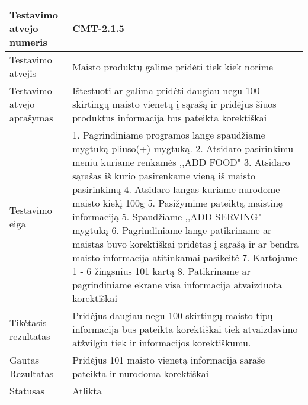 \documentclass[oneside]{VUMIFPSkursinis}
\begin{document}
\begin{center}
    \begin{tabular}{ |p{5cm}|p{13cm}|}
    \hline
        Testavimo atvejo numeris & CMT-2.1.5  \\ \hline
        Testavimo atvejis & Maisto produktų galime pridėti tiek kiek norime  \\ \hline
        Testavimo atvejo aprašymas & Ištestuoti ar galima pridėti daugiau negu 100 skirtingų maisto vienetų į sąrašą ir pridėjus šiuos produktus informacija bus pateikta korektiškai \\ \hline
        Testavimo eiga & 1. Pagrindiniame programos lange spaudžiame mygtuką pliuso(+) mygtuką. 
				2. Atsidaro pasirinkimu meniu kuriame renkamės ,,ADD FOOD"
				3. Atsidaro sąrašas iš kurio pasirenkame vieną iš maisto pasirinkimų
				4. Atsidaro langas kuriame nurodome maisto kiekį 100g
				5. Pasižymime pateiktą maistinę informaciją
				5. Spaudžiame ,,ADD SERVING"  mygtuką
				6. Pagrindiniame lange patikriname ar maistas buvo korektiškai pridėtas į sąrašą ir ar bendra maisto informacija atitinkamai pasikeitė 
				7. Kartojame 1 - 6 žingsnius 101 kartą
				8. Patikriname ar pagrindiniame ekrane visa informacija atvaizduota korektiškai \\ \hline
        Tikėtasis rezultatas & Pridėjus daugiau negu 100 skirtingų maisto tipų informacija bus pateikta korektiškai tiek atvaizdavimo atžvilgiu tiek ir informacijos korektiškumu.\\ \hline
        Gautas Rezultatas & Pridėjus 101 maisto vienetą informacija saraše pateikta ir nurodoma korektiškai  \\ \hline
        Statusas & Atlikta  \\ \hline
    \hline
    \end{tabular}
\end{center}
\end{document}
